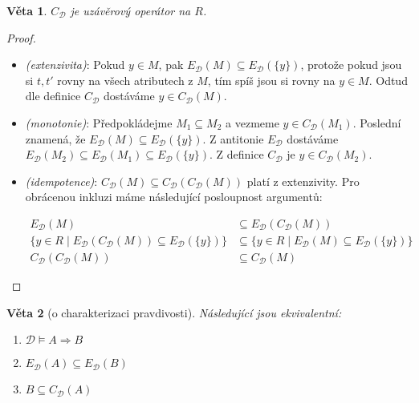 \documentclass{article}
\newtheorem{theorem}{Věta}
\theoremstyle {definition}
\begin{document}
\begin{theorem}
 $C_{\mathcal{D}}$ je uzávěrový operátor na $R$.
\end{theorem}
\begin{proof}
  \begin{itemize}
  \item \emph {(extenzivita)}: Pokud $y \in M$, pak
    $E_{\mathcal{D}}(M) \subseteq E_{\mathcal{D}}(\{y\})$, protože
    pokud jsou si $t, t'$ rovny na všech atributech z $M$, tím spíš
    jsou si rovny na $y \in M$. Odtud dle definice $C_{\mathcal{D}}$
    dostáváme $y \in C_{\mathcal{D}}(M)$.

  \item \emph{(monotonie)}: Předpokládejme $M_1 \subseteq M_2$ a
    vezmeme $y \in C_{\mathcal{D}}(M_1)$. Poslední znamená, že
    $E_{\mathcal{D}}(M) \subseteq E_{\mathcal{D}}(\{y\})$. Z antitonie
    $E_{\mathcal{D}}$ dostáváme $E_{\mathcal{D}}(M_2) \subseteq
    E_{\mathcal{D}}(M_1) \subseteq E_{\mathcal{D}}(\{y\})$. Z definice
    $C_{\mathcal{D}}$ je $y \in C_{\mathcal{D}}(M_2)$.
    
  \item \emph{(idempotence)}: $C_{\mathcal{D}}(M) \subseteq
    C_{\mathcal{D}}(C_{\mathcal{D}}(M))$ platí z extenzivity. Pro
    obrácenou inkluzi máme následující posloupnost argumentů:

    \begin {align*}
      E_{\mathcal{D}}(M) &\subseteq E_{\mathcal{D}}(C_{\mathcal{D}}(M))
      \\
      \{y \in R \mid E_{\mathcal{D}}(C_{\mathcal{D}}(M)) \subseteq
      E_{\mathcal{D}}(\{y\})\} &\subseteq \{y \in R \mid
      E_{\mathcal{D}}(M) \subseteq E_{\mathcal{D}}(\{y\})\}
      \\
      C_{\mathcal{D}}(C_{\mathcal{D}}(M)) &\subseteq
      C_{\mathcal{D}}(M)
    \end {align*}
\end{itemize}
\end{proof}

\begin{theorem}[o charakterizaci pravdivosti]
Následující jsou ekvivalentní:
\begin{enumerate}
\item
$\mathcal{D} \models A \Rightarrow B$
\item
$E_{\mathcal{D}}(A) \subseteq E_{\mathcal{D}}(B)$
\item
$B \subseteq C_{\mathcal{D}}(A)$
\end{enumerate}
\end{theorem}
\end{document}
